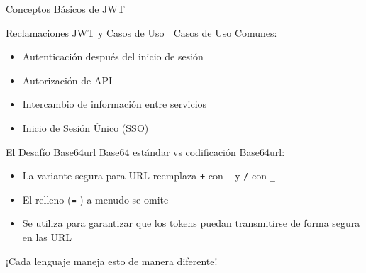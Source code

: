 \documentclass[presentation,aspectratio=169]{beamer}
\begin{document}
\begin{frame}[label={sec:org86199bc},fragile]{Conceptos Básicos de JWT}
\begin{block}{Reclamaciones JWT y Casos de Uso 🔰}
\alert{Casos de Uso Comunes:}
\begin{itemize}
\item Autenticación después del inicio de sesión
\item Autorización de API
\item Intercambio de información entre servicios
\item Inicio de Sesión Único (SSO)
\end{itemize}
\end{block}
\begin{block}{El Desafío Base64url}
Base64 estándar vs codificación Base64url:
\begin{itemize}
\item La variante segura para URL reemplaza \texttt{+} con \texttt{-} y \texttt{/} con \texttt{\_}
\item El relleno (\texttt{=} ) a menudo se omite
\item Se utiliza para garantizar que los tokens puedan transmitirse de forma segura en las URL
\end{itemize}

\alert{¡Cada lenguaje maneja esto de manera diferente!}
\end{block}
\end{frame}
\end{document}
